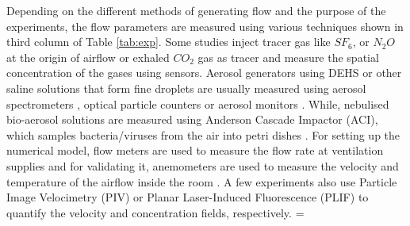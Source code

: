 \documentclass[a4paper,12pt]{elsarticle}
\begin{document}
Depending on the different methods of generating flow and the purpose of the experiments, the flow parameters are measured using various techniques shown in third column of Table \ref{tab:exp}. Some studies inject tracer gas like $SF_6$, or $N_2O$ at the origin of airflow \cite{qian2008dispersion, cheng2021experimental} or exhaled $CO_2$ gas as tracer \cite{deng2021control} and measure the spatial concentration of the gases using sensors. Aerosol generators using DEHS or other saline solutions that form fine droplets are usually measured using aerosol spectrometers \cite{duill2021impact}, optical particle counters \cite{berrouk2010experimental} or aerosol monitors \cite{zhou2021experimental}. While, nebulised bio-aerosol solutions are measured using Anderson Cascade Impactor (ACI), which samples bacteria/viruses from the air into petri dishes \cite{liu2020full,liu2020experimental}. For setting up the numerical model, flow meters are used to measure the flow rate at ventilation supplies \cite{li2005role,liu2023estimating} and for validating it, anemometers are used to measure the velocity and temperature of the airflow inside the room \cite{li2023numerical,arpino2023cfd}. A few experiments also use Particle Image Velocimetry (PIV) \cite{faleiros2022tu} or Planar Laser-Induced Fluorescence (PLIF) \cite{poussou2010flow} to quantify the velocity and concentration fields, respectively.
\LTcapwidth=\textwidth
\end{document}
